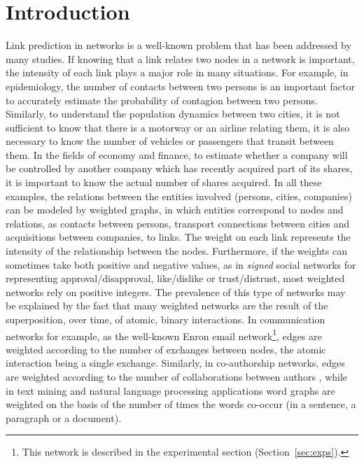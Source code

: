 \section{Introduction}

Link prediction in networks is a well-known problem that has been addressed by many studies. If knowing that a link relates two nodes in a network is important, the intensity of each link plays a major role in many situations. For example, in epidemiology, the number of contacts between two persons is an important factor to accurately estimate the probability of contagion between two persons. Similarly, to understand the population dynamics between two cities, it is not sufficient to know that there is a motorway or an airline relating them, it is also necessary to know the number of vehicles or passengers that transit between them. In the fields of economy and finance, to estimate whether a company will be controlled by another company which has recently acquired part of its shares, it is important to know the actual number of shares acquired. In all these examples, the relations between the entities involved (persons, cities, companies) can be modeled by weighted graphs, in which entities correspond to nodes and relations, as contacts between persons, transport connections between cities and acquisitions between companies, to links. The weight on each link represents the intensity of the relationship between the nodes. Furthermore, if the weights can sometimes take both positive and negative values, as in \textit{signed} social networks for representing approval/disapproval, like/dislike or trust/distrust, most weighted networks rely on positive integers. The prevalence of this type of networks may be explained by the fact that many weighted networks are the result of the superposition, over time, of atomic, binary interactions. In communication networks for example, as the well-known Enron email network\footnote{This network is described in the experimental section (Section~\ref{sec:exps}).}, edges are weighted according to the number of exchanges between nodes, the atomic interaction being a single exchange. Similarly, in co-authorship networks, edges are weighted according to the number of collaborations between authors \cite{newman2001scientific}, while in text mining and natural language processing applications word graphs are weighted on the basis of the number of times the words co-occur (in a sentence, a paragraph or a document).

